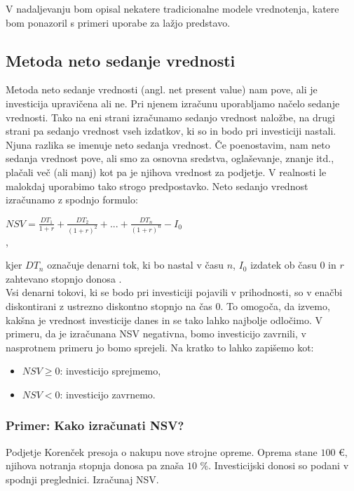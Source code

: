 V nadaljevanju  bom opisal nekatere tradicionalne modele vrednotenja, katere bom ponazoril s primeri uporabe za lažjo predstavo.

\subsection{Metoda neto sedanje vrednosti}
Metoda neto sedanje vrednosti (angl. net present value) nam pove, ali je investicija upravičena ali ne. Pri njenem izračunu uporabljamo načelo sedanje vrednosti. Tako na eni strani izračunamo sedanjo vrednost naložbe, na drugi strani pa sedanjo vrednost vseh izdatkov, ki so in bodo pri investiciji nastali. Njuna razlika se imenuje neto sedanja vrednost. Če poenostavim, nam neto sedanja vrednost pove, ali smo za osnovna sredstva, oglaševanje, znanje itd., plačali več (ali manj) kot pa je njihova vrednost za podjetje. V realnosti le malokdaj uporabimo tako strogo predpostavko. Neto sedanjo vrednost izračunamo z spodnjo formulo: \\

\begin{center}
$  NSV = \tfrac{DT_1}{1+r} + \tfrac{DT_2}{(1+r)^2} + ... + \tfrac{DT_n}{(1+r)^n} - I_0 $ \\,
\end{center}

kjer $DT_n$ označuje denarni tok, ki bo nastal v času $n$, $I_0$ izdatek ob času 0 in $r$ zahtevano stopnjo donosa \cite[str. 154]{Mramor}. \\

Vsi denarni tokovi, ki se bodo pri investiciji pojavili v prihodnosti, so v enačbi diskontirani z ustrezno diskontno stopnjo na čas 0. To omogoča, da izvemo, kakšna je vrednost investicije danes in se tako lahko najbolje  odločimo. V primeru, da je izračunana NSV negativna, bomo investicijo zavrnili, v nasprotnem primeru jo bomo sprejeli. Na kratko to lahko zapišemo kot:

\begin{itemize}
\item $NSV \geq 0$: investicijo sprejmemo,
\item $NSV<0$: investicijo zavrnemo.
\end{itemize}

\subsubsection{Primer: Kako izračunati NSV?}
Podjetje Korenček presoja o nakupu nove strojne opreme. Oprema stane $100$ €, njihova notranja stopnja donosa pa znaša $10$ \%. Investicijski donosi so podani v spodnji preglednici. Izračunaj NSV. \\


